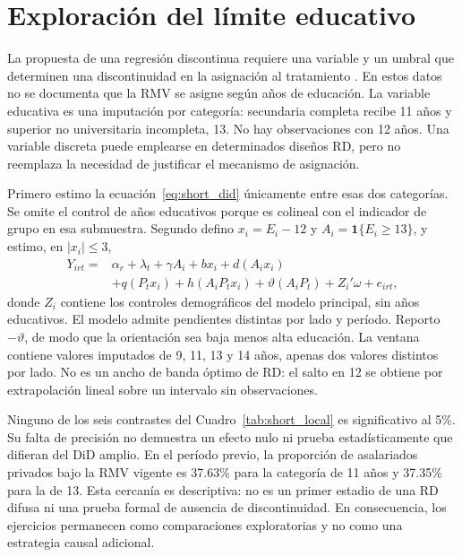 \section{Exploración del límite educativo}
\label{app:short_local}

La propuesta de una regresión discontinua requiere una variable y un umbral que determinen una discontinuidad en la asignación al tratamiento \citep{cattaneo_titiunik_2022_short}. En estos datos no se documenta que la RMV se asigne según años de educación. La variable educativa es una imputación por categoría: secundaria completa recibe 11 años y superior no universitaria incompleta, 13. No hay observaciones con 12 años. Una variable discreta puede emplearse en determinados diseños RD, pero no reemplaza la necesidad de justificar el mecanismo de asignación.

Primero estimo la ecuación~\eqref{eq:short_did} únicamente entre esas dos categorías. Se omite el control de años educativos porque es colineal con el indicador de grupo en esa submuestra. Segundo defino $x_i=E_i-12$ y $A_i=\mathbf{1}\{E_i\ge13\}$, y estimo, en $|x_i|\le3$,
\begin{equation}
\begin{split}
Y_{irt}={}&\alpha_r+\lambda_t+\gamma A_i+b x_i+d(A_ix_i)\\
&+q(P_tx_i)+h(A_iP_tx_i)+\vartheta(A_iP_t)+Z_i'\omega+e_{irt},
\end{split}
\label{eq:short_jump}
\end{equation}
donde $Z_i$ contiene los controles demográficos del modelo principal, sin años educativos. El modelo admite pendientes distintas por lado y período. Reporto $-\vartheta$, de modo que la orientación sea baja menos alta educación. La ventana contiene valores imputados de 9, 11, 13 y 14 años, apenas dos valores distintos por lado. No es un ancho de banda óptimo de RD: el salto en 12 se obtiene por extrapolación lineal sobre un intervalo sin observaciones.



Ninguno de los seis contrastes del Cuadro~\ref{tab:short_local} es significativo al 5\%. Su falta de precisión no demuestra un efecto nulo ni prueba estadísticamente que difieran del DiD amplio. En el período previo, la proporción de asalariados privados bajo la RMV vigente es 37.63\% para la categoría de 11 años y 37.35\% para la de 13. Esta cercanía es descriptiva: no es un primer estadio de una RD difusa ni una prueba formal de ausencia de discontinuidad. En consecuencia, los ejercicios permanecen como comparaciones exploratorias y no como una estrategia causal adicional.
\FloatBarrier
